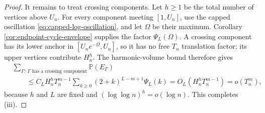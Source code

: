 \documentclass[11pt]{article}
\theoremstyle{remark}
\newcommand{\Pp}{\mathbb P}
\begin{document}
\begin{proof}
It remains to treat crossing components.  Let $h\ge1$ be the total number of
vertices above $U_n$.  For every component meeting $[1,U_n]$, use the capped
oscillation \eqref{eq:capped-log-oscillation}, and let $\Omega$ be their
maximum.  Corollary \ref{cor:endpoint-cycle-envelope} supplies the factor
$\Psi_L(\Omega)$.  A crossing component has its lower anchor in
$[U_ne^{-\Omega},U_n]$, so it has no free $T_n$ translation factor; its upper
vertices contribute $H_n^h$.  The harmonic-volume bound therefore gives
\[
\begin{aligned}
&\sum_{\Gamma:\ \Gamma\text{ has a crossing component}}
\Pp(E_\Gamma)\\
&\qquad\le C_LH_n^hT_n^{m-1}
\sum_{k\ge0}(2+k)^{L-m+1}\Psi_L(k)
=O_L(H_n^hT_n^{m-1})=o(T_n^m),
\end{aligned}
\tag{10.56}\label{eq:crossing-boundary-cycle-sum}
\]
because $h$ and $L$ are fixed and $(\log\log n)^h=o(\log n)$.  This completes
(iii).
\end{proof}
\end{document}
